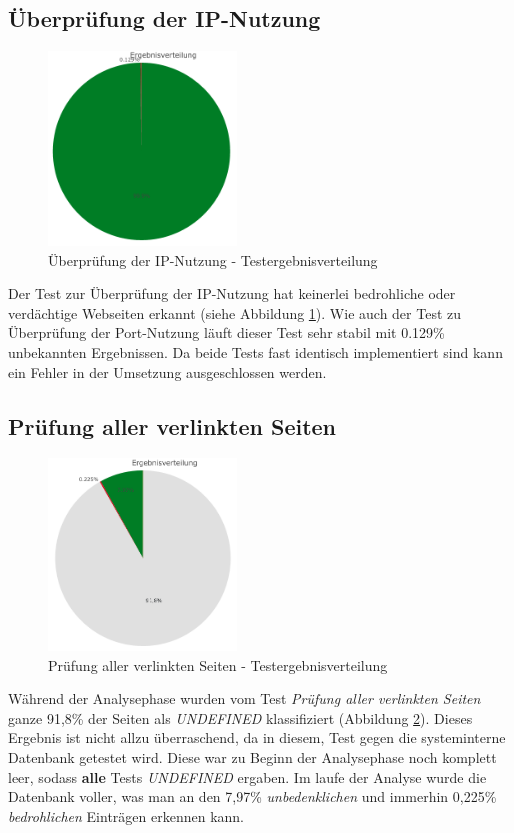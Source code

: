 \subsection{Überprüfung der IP-Nutzung}

\begin{figure}[H]
  \centering
  \includegraphics[width=5cm]{images/stats/diaipscan}
  \caption{Überprüfung der IP-Nutzung - Testergebnisverteilung}
  \label{fig:analyse-diaipscan}
\end{figure}

Der Test zur Überprüfung der IP-Nutzung hat keinerlei bedrohliche oder verdächtige Webseiten erkannt (siehe Abbildung \ref{fig:analyse-diaipscan}). Wie auch der Test zu Überprüfung der Port-Nutzung läuft dieser Test sehr stabil mit 0.129\% unbekannten Ergebnissen. Da beide Tests fast identisch implementiert sind kann ein Fehler in der Umsetzung ausgeschlossen werden.

\subsection{Prüfung aller verlinkten Seiten}
\begin{figure}[H]
  \centering
  \includegraphics[width=5cm]{images/stats/dialinkchecker}
  \caption{Prüfung aller verlinkten Seiten - Testergebnisverteilung}
  \label{fig:analyse-dialinkchecker}
\end{figure}

Während der Analysephase wurden vom Test \textit{Prüfung aller verlinkten Seiten} ganze 91,8\% der
Seiten als \textit{UNDEFINED} klassifiziert (Abbildung \ref{fig:analyse-dialinkchecker}).
Dieses Ergebnis ist nicht allzu überraschend, da in diesem, Test gegen die systeminterne Datenbank getestet wird.
Diese war zu Beginn der Analysephase noch komplett leer, sodass \textbf{alle} Tests \textit{UNDEFINED} ergaben.
Im laufe der Analyse wurde die Datenbank voller, was man an den 7,97\% \textit{unbedenklichen} und immerhin
0,225\% \textit{bedrohlichen} Einträgen erkennen kann.

